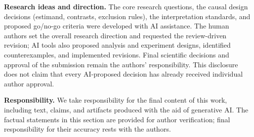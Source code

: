 \documentclass{article}
\begin{document}
\textbf{Research ideas and direction.} The core research questions, the causal
design decisions (estimand, contrasts, exclusion rules), the interpretation
standards, and proposed go/no-go criteria were developed with AI assistance.
The human authors set the overall research direction and requested the
review-driven revision; AI tools also proposed analysis and experiment
designs, identified counterexamples, and implemented revisions. Final
scientific decisions and approval of the submission remain the authors'
responsibility. This disclosure does not claim that every AI-proposed
decision has already received individual author approval.

\textbf{Responsibility.} We take responsibility for the final content of this
work, including text, claims, and artifacts produced with the aid of generative
AI. The factual statements in this section are provided for author verification;
final responsibility for their accuracy rests with the authors.




\appendix


\end{document}
